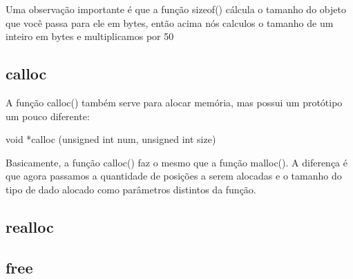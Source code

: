 \documentclass{report}
\begin{document}
	Uma observação importante é que a função sizeof() cálcula o tamanho do objeto que você passa para ele em bytes, então acima nós calculos o tamanho de um inteiro em bytes e multiplicamos por 50
	
	\subsection{calloc}
	
	A função calloc() também serve para alocar memória, mas possui um protótipo um pouco
	diferente:
	
	\begin{center}
		\begin{LARGE}
			void *calloc (unsigned int num, unsigned int size)
		\end{LARGE}
	\end{center}
	
	Basicamente, a função calloc() faz o mesmo que a função malloc(). A diferença é que agora
	passamos a quantidade de posições a serem alocadas e o tamanho do tipo de dado alocado
	como parâmetros distintos da função.

	
	\subsection{realloc}
	
	\subsection{free}
	
	
	
	
	
	
\end{document}
